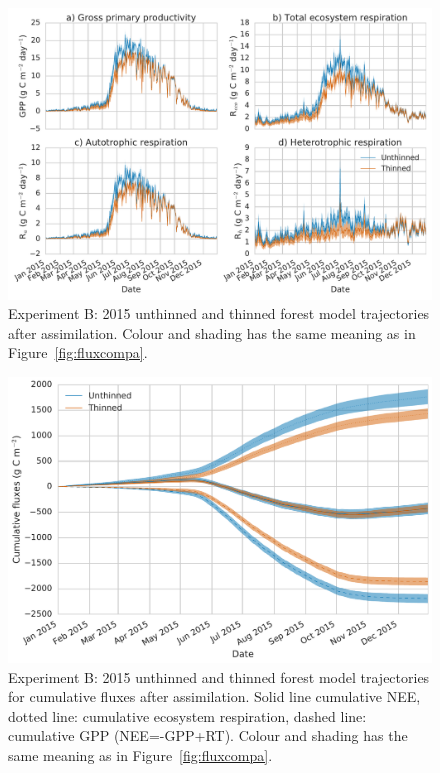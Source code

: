 \documentclass[draft,jgrga]{agutexSI}
\begin{document}
 
 \begin{figure}
 \noindent\includegraphics[width=40pc]{flux_compb.pdf}
\caption{Experiment B: 2015 unthinned and thinned forest model trajectories after assimilation. Colour and shading has the same meaning as in Figure~\ref{fig:fluxcompa}.}
 \label{fig:fluxcompb}
 \end{figure}
 
  \begin{figure}
 \noindent\includegraphics[width=40pc]{cum_fluxb.pdf}
\caption{Experiment B: 2015 unthinned and thinned forest model trajectories for cumulative fluxes after assimilation. Solid line cumulative NEE, dotted line: cumulative ecosystem respiration, dashed line: cumulative GPP (NEE=-GPP+RT). Colour and shading has the same meaning as in Figure~\ref{fig:fluxcompa}.}
 \label{fig:fluxcumb}
 \end{figure}
 
\end{document}
